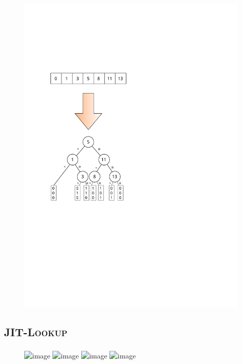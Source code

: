 \documentclass[xcolor=x11names,compress]{beamer}
\renewcommand{\(}{\begin{columns}}
\renewcommand{\)}{\end{columns}}
\newcommand{\<}[1]{\begin{column}{#1}}
\renewcommand{\>}{\end{column}}
\begin{document}
\begin{frame}
  \begin{figure}
  \centering
  \includegraphics[scale=0.6]{figures/array_to_tree}
  \end{figure}
\end{frame}

\subsection{\scshape JIT-Lookup}
\begin{frame}
  \frametitle{\insertsubsection}
  \begin{figure}
  \centering
  \includegraphics<1>[height=0.7\textheight]{figures/match_in_tree-L1-2}
  \includegraphics<2>[height=0.7\textheight]{figures/match_in_tree-L1_3}
  \includegraphics<3>[height=0.7\textheight]{figures/match_in_tree-L1_4}
  \includegraphics<4>[height=0.7\textheight]{figures/match_in_tree-L1_5}
  \end{figure}
\end{frame}
\end{document}
